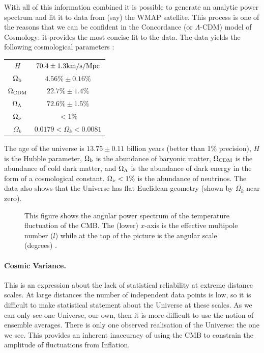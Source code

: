 With all of this information combined it is possible to generate an analytic power spectrum and fit it to data from (say) the WMAP satellite. This process is one of the reasons that we can be confident in the Concordance (or $\Lambda$-CDM) model of Cosmology: it provides the most concise fit to the data. The data yields the following cosmological parameters \citep{bib_wmap7}:

\vspace*{1cm}
\begin{center}
\begin{tabular}{|c|c|}
  \hline
  $H$ &  $70.4 \pm 1.3 {\rm km/s / Mpc}$    \\
  $\Omega_{\rm b} $ & $ 4.56\%  \pm  0.16\%$ \\
  $\Omega_{\rm CDM} $ & $ 22.7\%  \pm  1.4\%$     \\
  $\Omega_{\rm \Lambda} $ & $ 72.6\%  \pm  1.5\%$  \\ 
  $\Omega_{\rm \nu} $ & $ < 1\%$ \\
  $\Omega_k$ & $ 0.0179 < \Omega_k < 0.0081$  \\
  \hline
\end{tabular}
\end{center}
\vspace*{1cm}

The age of the universe is $13.75 \pm 0.11$ billion years (better than 1\% precision), $H$ is the Hubble parameter, $\Omega_{\rm b}$ is the abundance of baryonic matter, $\Omega_{\rm CDM}$ is the abundance of cold dark matter, and $\Omega_{\rm \Lambda}$ is the abundance of dark energy in the form of a cosmological constant. $\Omega_{\rm \nu} < 1\%$ is the abundance of neutrinos. The data also shows that the Universe has flat Euclidean geometry (shown by $\Omega_k$ near zero).


\begin{figure}[htb]
   \begin{center}
     \leavevmode
                \epsfxsize=150mm

   \end{center}
\caption{This figure shows the angular power spectrum of the temperature fluctuation of the CMB. The (lower) $x$-axis is the effective multipole number ($l$) while at the top of the picture is the angular scale (degrees) \citep{bib_wright}.}
\label{fig.ang_power}
\end{figure}


\paragraph{Cosmic Variance.}
This is an expression about the lack of statistical reliability at extreme distance scales. At large distances the number of independent data points is low, so it is difficult to make statistical statement about the Universe at these scales. As we can only see one Universe, our own, then it is more difficult to use the notion of ensemble averages. There is only one observed realisation of the Universe: the one we see. This provides an inherent inaccuracy of using the CMB to constrain the amplitude of fluctuations from Inflation.

